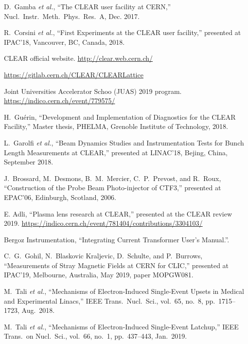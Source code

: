 \documentclass[a4paper,
               keeplastbox,   %
               ]{jacow}
\begin{document}
\begin{thebibliography}{99}
 D.\ Gamba \emph{et al.}, “The CLEAR user facility at CERN,” Nucl.\ Instr.\ Meth.\ Phys.\ Res.\ A, Dec. 2017.

 R.\ Corsini \emph{et al.}, “First Experiments at the CLEAR user facility,” presented at IPAC'18, Vancouver, BC, Canada, 2018.

 CLEAR official website. \url{http://clear.web.cern.ch/}

 \url{https://gitlab.cern.ch/CLEAR/CLEARLattice}

 Joint Universities Accelerator Schoo (JUAS) 2019 program. \url{https://indico.cern.ch/event/779575/}

 H.\ Guérin, “Development and Implementation of Diagnostics for the CLEAR Facility,” Master thesis, PHELMA, Grenoble Institute of Technology, 2018.

 L.\ Garolfi \emph{et al.}, “Beam Dynamics Studies and Instrumentation Tests for Bunch Length Measurements at CLEAR,” presented at LINAC'18, Bejing, China, September 2018.

 J.\ Brossard, M.\ Desmons, B.\ M.\ Mercier, C.\ P.\ Prevost, and R.\ Roux, “Construction of the Probe Beam Photo-injector of CTF3,” presented at EPAC'06, Edinburgh, Scotland, 2006.

 E. Adli, ``Plasma lens research at CLEAR,'' presented at the CLEAR review 2019. \url{https://indico.cern.ch/event/781404/contributions/3304103/}

 Bergoz Instrumentation, “Integrating Current Transformer User’s Manual.”.

   C.\ G.\ Gohil, N.\ Blaskovic Kraljevic, D.\ Schulte, and P.\ Burrows,
   “Measurements of Stray Magnetic Fields at CERN for CLIC,”
   presented at IPAC'19, Melbourne, Australia, May 2019, paper MOPGW081.

 M.\ Tali \emph{et al.}, “Mechanisms of Electron-Induced Single-Event Upsets in Medical and Experimental Linacs,” IEEE Trans.\ Nucl.\ Sci., vol.\ 65, no.\ 8, pp.\ 1715--1723, Aug.\ 2018.

 M.\ Tali \emph{et al.}, “Mechanisms of Electron-Induced Single-Event Latchup,” IEEE Trans.\ on Nucl.\ Sci., vol.\ 66, no.\ 1, pp.\ 437--443, Jan.\ 2019.


\end{thebibliography}
\end{document}
